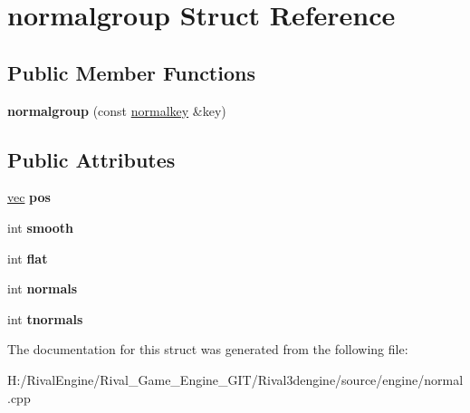 \hypertarget{structnormalgroup}{}\section{normalgroup Struct Reference}
\label{structnormalgroup}
\subsection*{Public Member Functions}
\begin{DoxyCompactItemize}
\item 
\mbox{\label{structnormalgroup_ae300645ea83684714cb8316bac72f6d7}} 
{\bfseries normalgroup} (const \hyperlink{structnormalkey}{normalkey} \&key)
\end{DoxyCompactItemize}
\subsection*{Public Attributes}
\begin{DoxyCompactItemize}
\item 
\mbox{\label{structnormalgroup_aa9d07141bae79c345fbc9e55db35150a}} 
\hyperlink{structvec}{vec} {\bfseries pos}
\item 
\mbox{\label{structnormalgroup_aefe6d739087caa79703d16c0925f2dfe}} 
int {\bfseries smooth}
\item 
\mbox{\label{structnormalgroup_ac88a9a2b3f9b9b962c5c6d633d2138e7}} 
int {\bfseries flat}
\item 
\mbox{\label{structnormalgroup_a1c740f8c2aa4fb2e8bd507676d5fe950}} 
int {\bfseries normals}
\item 
\mbox{\label{structnormalgroup_af30b5f799b79833a542881cd2aa13ef5}} 
int {\bfseries tnormals}
\end{DoxyCompactItemize}


The documentation for this struct was generated from the following file\+:\begin{DoxyCompactItemize}
\item 
H\+:/\+Rival\+Engine/\+Rival\+\_\+\+Game\+\_\+\+Engine\+\_\+\+G\+I\+T/\+Rival3dengine/source/engine/normal.\+cpp\end{DoxyCompactItemize}
